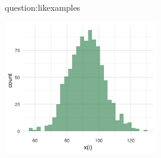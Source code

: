 \begin{question}{question:likexamples}
\begin{enumerate}
\begin{center}
\includegraphics[width=0.5\textwidth]{img/l01-problem5.png}
\end{center}

    \end{enumerate}
\end{question}

